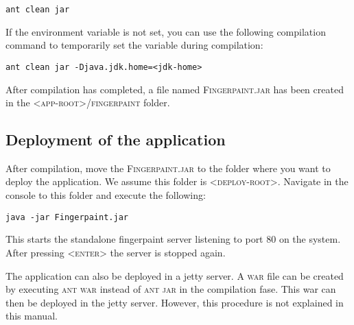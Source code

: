 \begin{verbatim}
ant clean jar
\end{verbatim}

If the environment variable is not set, you can use the following compilation command to temporarily set the variable during compilation:

\begin{verbatim}
ant clean jar -Djava.jdk.home=<jdk-home>
\end{verbatim}

After compilation has completed, a file named \textsc{Fingerpaint.jar} has been created in the \textsc{<app-root>/fingerpaint} folder.

\subsection{Deployment of the application}
\label{sec:deployment}
After compilation, move the \textsc{Fingerpaint.jar} to the folder where you want to deploy the application. We assume this folder is \textsc{<deploy-root>}. Navigate in the console to this folder and execute the following:

\begin{verbatim}
java -jar Fingerpaint.jar
\end{verbatim}

This starts the standalone fingerpaint server listening to port 80 on the system. After pressing \textsc{<enter>} the server is stopped again.

The application can also be deployed in a jetty server. A \textsc{war} file can be created by executing \textsc{ant war} instead of \textsc{ant jar} in the compilation fase. This war can then be deployed in the jetty server. However, this procedure is not explained in this manual.